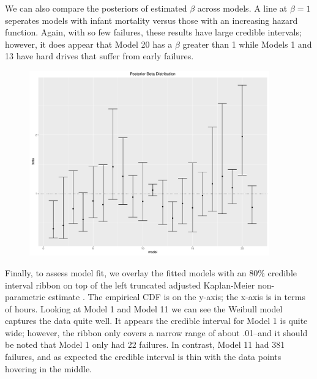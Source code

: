 \documentclass{scrartcl}
\begin{document}
We can also compare the posteriors of estimated $\beta$ across models.  A line at $\beta=1$ seperates models with infant mortality versus those with an increasing hazard function.  Again, with so few failures, these results have large credible intervals; however, it does appear that Model 20 has a $\beta$ greater than 1 while Models 1 and 13 have hard drives that suffer from early failures.
\begin{figure}[H]
\centering
\includegraphics[height=8cm]{postbeta.pdf}
\end{figure}

Finally, to assess model fit, we overlay the fitted models with an 80\% credible interval ribbon on top of the left truncated adjusted Kaplan-Meier non-parametric estimate \cite{meeker2014statistical}.  The empirical CDF is on the y-axis; the x-axis is in terms of hours.  Looking at Model 1 and Model 11 we can see the Weibull model captures the data quite well.  It appears the credible interval for Model 1 is quite wide; however, the ribbon only covers a narrow range of about .01--and it should be noted that Model 1 only had 22 failures.  In contrast, Model 11 had 381 failures, and as expected the credible interval is thin with the data points hovering in the middle.
\end{document}
